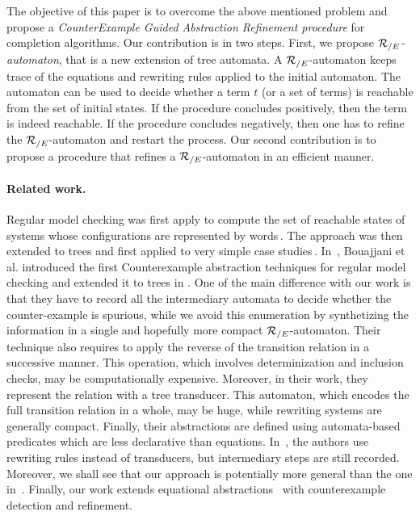 The objective of this paper is to overcome the above mentioned problem
and propose a {\em CounterExample Guided Abstraction Refinement
  procedure} for completion algorithms. Our contribution is in two
steps. First, we propose {\em ${\mathcal R_{/E}}$-automaton}, that is a new
extension of tree automata. A ${\mathcal R_{/E}}$-automaton keeps trace of the
equations and rewriting rules applied to the initial automaton. The
automaton can be used to decide whether a term $t$ (or a set of terms)
is reachable from the set of initial states. If the procedure
concludes positively, then the term is indeed reachable. If the
procedure concludes negatively, then one has to refine the
${\mathcal R_{/E}}$-automaton and restart the process. Our second contribution is to
propose a procedure that refines a ${\mathcal R_{/E}}$-automaton in an efficient
manner.

\vspace{-.6cm}
\paragraph{Related work.} Regular model checking was first apply to
compute the set of reachable states of systems whose configurations
are represented by words\,\cite{BJNT00,BLW03}. The approach was then
extended to trees and first applied to very simple case
studies\,\cite{ALRd05}. In~\cite{BHV04}, Bouajjani et al. introduced
the first Counterexample abstraction techniques for regular model
checking and extended it to trees in \cite{BHRV06a}.  One of the main
difference with our work is that they have to record all the
intermediary automata to decide whether the counter-example is
spurious, while we avoid this enumeration by synthetizing the
information in a single and hopefully more compact ${\mathcal R_{/E}}$-automaton.
Their technique also requires to apply the reverse of the transition
relation in a successive manner. This operation, which involves
determinization and inclusion checks, may be computationally
expensive. Moreover, in their work, they represent the relation with a
tree transducer. This automaton, which encodes the full transition
relation in a whole, may be huge, while rewriting systems are
generally compact. Finally, their abstractions are defined using
automata-based predicates which are less declarative than
equations. In~\cite{BCHK08}, the authors use rewriting rules instead
of transducers, but intermediary steps are still recorded. Moreover,
we shall see that our approach is potentially more general than the
one in~\cite{BCHK08}. Finally, our work extends equational
abstractions~\cite{MeseguerPM-TCS08,Takai-RTA04} with counterexample
detection and refinement.



